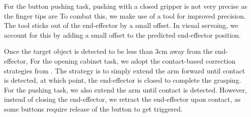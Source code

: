 For the button pushing task, pushing with a closed gripper is not very precise as the finger tips are 
To combat this, we make use of a tool for improved precision.
The tool sticks out of the end-effector by a small offset.
In visual servoing, we account for this by adding a small offset to the predicted end-effector position.


Once the target object is detected to be less than $3$cm away from the end-effector, 
For the opening cabinet task, we adopt the contact-based correction strategies from \cite{gupta2024opening}.
The strategy is to simply extend the arm forward until contact is detected, at which point, the end-effector is closed to complete the grasping.
For the pushing task, we also extend the arm until contact is detected.
However, instead of closing the end-effector, we retract the end-effector upon contact, as some buttons require release of the button to get triggered.

